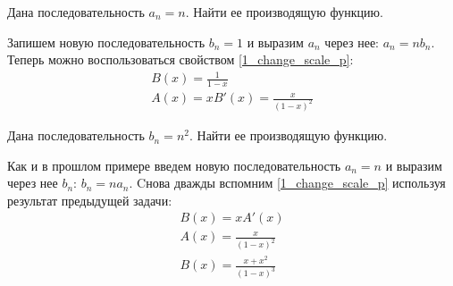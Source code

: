 \begin{task}
    Дана последовательность $a_n = n$. Найти ее производящую функцию.
    \begin{solution}
        Запишем новую последовательность $b_n = 1$ и выразим $a_n$ через нее: $a_n = n b_n$.
        Теперь можно воспользоваться свойством \ref{1_change_scale_p}:
        \begin{gather*}
            B(x) = \frac{1}{1-x} \\
            A(x) = xB'(x) = \frac{x}{(1-x)^2}
        \end{gather*}
    \end{solution}
\end{task}

\begin{task}
    Дана последовательность $b_n = n^2$. Найти ее производящую функцию.
    \begin{solution}
        Как и в прошлом примере введем новую последовательность $a_n = n$ и выразим через нее
        $b_n$: $b_n = na_n$. Cнова дважды вспомним \ref{1_change_scale_p} используя результат
        предыдущей задачи:
        \begin{gather*}
            B(x) = xA'(x) \\
            A(x) = \frac{x}{(1 - x)^2} \\
            B(x) = \frac{x + x^2}{(1 - x)^3}
        \end{gather*}
    \end{solution}
\end{task}

